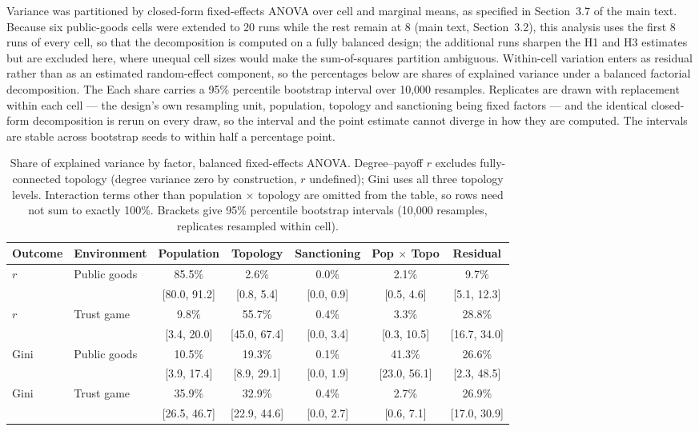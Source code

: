 \documentclass[11pt,a4paper]{article}
\begin{document}
Variance was partitioned by closed-form fixed-effects ANOVA over cell
and marginal means, as specified in Section~3.7 of the main text.
Because six public-goods cells were extended to 20 runs while the rest
remain at 8 (main text, Section~3.2), this analysis uses the first 8
runs of every cell, so
that the decomposition is computed on a fully balanced design; the
additional runs sharpen the H1 and H3 estimates but are excluded here,
where unequal cell sizes would make the sum-of-squares partition
ambiguous. Within-cell variation enters as residual rather than as an
estimated random-effect component, so the percentages below are shares
of explained variance under a balanced factorial decomposition. The
Each share carries a 95\% percentile bootstrap interval over 10,000
resamples. Replicates are drawn with replacement within each cell ---
the design's own resampling unit, population, topology and
sanctioning being fixed factors --- and the identical closed-form
decomposition is rerun on every draw, so the interval and the point
estimate cannot diverge in how they are computed. The intervals are
stable across bootstrap seeds to within half a percentage point.

\begin{table}[ht]
\centering
\small
\caption{Share of explained variance by factor, balanced fixed-effects
ANOVA. Degree--payoff $r$ excludes fully-connected topology (degree
variance zero by construction, $r$ undefined); Gini uses all three
topology levels. Interaction terms other than population $\times$
topology are omitted from the table, so rows need not sum to exactly
100\%. Brackets give 95\% percentile bootstrap intervals (10,000
resamples, replicates resampled within cell).}
\label{tab:anova}
\begin{tabular}{llccccc}
\toprule
Outcome & Environment & Population & Topology & Sanctioning & Pop $\times$ Topo & Residual \\
\midrule
$r$ & Public goods & 85.5\% & 2.6\% & 0.0\% & 2.1\% & 9.7\% \\
    &              & \tiny[80.0, 91.2] & \tiny[0.8, 5.4] & \tiny[0.0, 0.9] & \tiny[0.5, 4.6] & \tiny[5.1, 12.3] \\
$r$ & Trust game & 9.8\% & 55.7\% & 0.4\% & 3.3\% & 28.8\% \\
    &            & \tiny[3.4, 20.0] & \tiny[45.0, 67.4] & \tiny[0.0, 3.4] & \tiny[0.3, 10.5] & \tiny[16.7, 34.0] \\
Gini & Public goods & 10.5\% & 19.3\% & 0.1\% & 41.3\% & 26.6\% \\
     &              & \tiny[3.9, 17.4] & \tiny[8.9, 29.1] & \tiny[0.0, 1.9] & \tiny[23.0, 56.1] & \tiny[2.3, 48.5] \\
Gini & Trust game & 35.9\% & 32.9\% & 0.4\% & 2.7\% & 26.9\% \\
     &            & \tiny[26.5, 46.7] & \tiny[22.9, 44.6] & \tiny[0.0, 2.7] & \tiny[0.6, 7.1] & \tiny[17.0, 30.9] \\
\bottomrule
\end{tabular}
\end{table}
\end{document}
